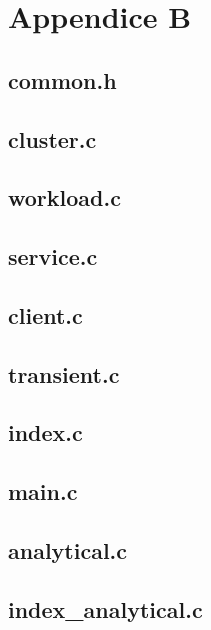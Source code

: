 \chapter{Appendice B}\label{appendiceB}
\lstset{frame=}
\section{common.h}

\pagebreak
\section{cluster.c}

\pagebreak
\section{workload.c}

\pagebreak
\section{service.c}

\pagebreak
\section{client.c}

\pagebreak
\section{transient.c}

\pagebreak
\section{index.c}

\pagebreak
\section{main.c}

\pagebreak
\section{analytical.c}

\pagebreak
\section{index_analytical.c}
